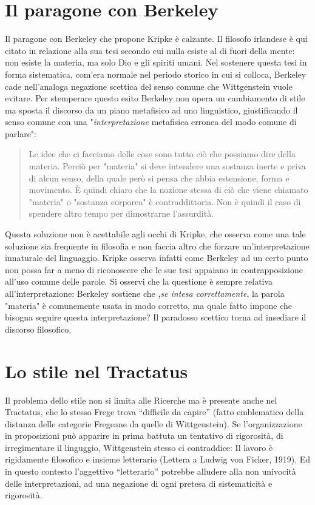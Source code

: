 \documentclass[10pt,a4paper]{article}
\begin{document}
\section{Il paragone con Berkeley}
Il paragone con Berkeley che propone Kripke è calzante. Il filosofo irlandese è qui citato in relazione alla sua tesi secondo cui nulla esiste al di fuori della mente: non esiste la materia, ma solo Dio e gli spiriti umani. Nel sostenere questa tesi in forma sistematica, com'era normale nel periodo storico in cui si colloca, Berkeley cade nell'analoga negazione scettica del senso comune che Wittgenstein vuole evitare. Per stemperare questo esito Berkeley non opera un cambiamento di stile ma sposta il discorso da un piano metafisico ad uno linguistico, giustificando il senso comune con una "\textit{interpretazione} metafisica erronea del modo comune di parlare": 
\begin{quote}
	Le idee che ci facciamo delle cose sono tutto ciò che possiamo dire della materia. Perciò per "materia" si deve intendere una sostanza inerte e priva di alcun senso, della quale però si pensa che abbia estensione, forma e movimento. È quindi chiaro che la nozione stessa di ciò che viene chiamato "materia" o "sostanza corporea" è contraddittoria. Non è quindi il caso di spendere altro tempo per dimostrarne l'assurdità.
\end{quote}
Questa soluzione non è acettabile agli occhi di Kripke, che osserva come una tale soluzione sia frequente in filosofia e non faccia altro che forzare un'interpretazione innaturale del linguaggio. Kripke osserva infatti come Berkeley ad un certo punto non possa far a meno di riconoscere che le sue tesi appaiano in contrapposizione all'uso comune delle parole. Si osservi che la questione è sempre relativa all'interpretazione: Berkeley sostiene che ,\textit{se intesa correttamente}, la parola "materia" è comunemente usata in modo corretto, ma quale fatto impone che bisogna seguire questa interpretazione? Il paradosso scettico torna ad insediare il discorso filosofico.
\section{Lo stile nel Tractatus}
Il problema dello stile non si limita alle Ricerche ma è presente anche nel Tractatus, che lo stesso Frege trova “difficile da capire” (fatto emblematico della distanza delle categorie Fregeane da quelle di Wittgenstein). Se l’organizzazione in proposizioni può apparire in prima battuta un tentativo di rigorosità, di irregimentare il linguggio, Wittgenstein stesso ci contraddice: Il lavoro è rigidamente filosofico e insieme letterario (Lettera a Ludwig von Ficker, 1919). Ed in questo contesto l’aggettivo “letterario” potrebbe alludere alla non univocità delle interpretazioni, ad una negazione di ogni pretesa di sistematicità e rigorosità.
\end{document}
